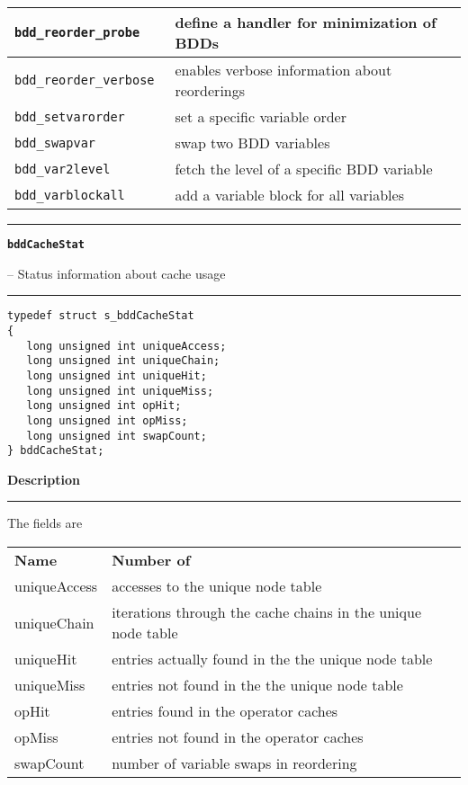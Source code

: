 \begin{supertabular}{|l|l|}
{\tt bdd\_reorder\_probe } & define a handler for minimization of BDDs  \\\hline
{\tt bdd\_reorder\_verbose } & enables verbose information about reorderings  \\\hline
{\tt bdd\_setvarorder } & set a specific variable order  \\\hline
{\tt bdd\_swapvar } & swap two BDD variables  \\\hline
{\tt bdd\_var2level } & fetch the level of a specific BDD variable  \\\hline
{\tt bdd\_varblockall } & add a variable block for all variables  \\ 
\end{supertabular}
\newpage \noindent 
\begin{minipage}{\textwidth}

\noindent\begin{minipage}{\textwidth}
\rule{\textwidth}{0.5mm}
{\tt\bf bddCacheStat }
\--- Status information about cache usage  \hspace{\fill}
\\\rule[1.5ex]{\textwidth}{0.5mm}
\end{minipage}

\noindent\begin{verbatim}
typedef struct s_bddCacheStat
{
   long unsigned int uniqueAccess;
   long unsigned int uniqueChain;
   long unsigned int uniqueHit;
   long unsigned int uniqueMiss;
   long unsigned int opHit;
   long unsigned int opMiss;
   long unsigned int swapCount;
} bddCacheStat; 
\end{verbatim}

\vspace{\parsep}\noindent
{\bf Description}\\\rule[1.5ex]{\textwidth}{0.2mm}\vspace{-1.5ex}\setlength{\parindent}{1em}
The fields are \\[\baselineskip] \begin{tabular}{ll}
  {\bf Name}         & {\bf Number of } \\
  uniqueAccess & accesses to the unique node table \\
  uniqueChain  & iterations through the cache chains in the unique node table\\
  uniqueHit    & entries actually found in the the unique node table \\
  uniqueMiss   & entries not found in the the unique node table \\
  opHit        & entries found in the operator caches \\
  opMiss       & entries not found in the operator caches \\
  swapCount    & number of variable swaps in reordering \\
\end{tabular} 


\end{minipage}
